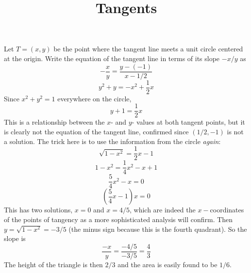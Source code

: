 \documentclass[11pt, oneside]{article}
\title{Tangents}
\date{}
\begin{document}
\maketitle
\large
Let $T=(x,y)$ be the point where the tangent line meets a unit circle centered at the origin.  Write the equation of the tangent line in terms of its slope $-x/y$ as
\[ -\frac{x}{y} =  \frac{y - (-1)}{x - 1/2} \]
\[ y^2 + y = -x^2 + \frac{1}{2} x \]
Since $x^2 + y^2 = 1$ everywhere on the circle,
\[ y + 1 = \frac{1}{2} x  \]
This is a relationship between the $x$- and $y$- values at both tangent points, but it is clearly not the equation of the tangent line, confirmed since $(1/2,-1)$ is not a solution.  The trick here is to use the information from the circle \emph{again}:
\[ \sqrt{1 - x^2} = \frac{1}{2} x - 1 \]
\[ 1 - x^2 = \frac{1}{4}x^2 - x + 1 \]
\[ \frac{5}{4}x^2 - x = 0 \]
\[ (\frac{5}{4}x - 1)x = 0 \]
This has two solutions, $x = 0$ and $x = 4/5$, which are indeed the $x-$coordinates of the points of tangency as a more sophisticated analysis will confirm.  Then $y = \sqrt{1 - x^2} = -3/5$ (the minus sign because this is the fourth quadrant).  So the slope is 
\[ \frac{-x}{y} = \frac{-4/5}{-3/5} = \frac{4}{3} \]
The height of the triangle is then $2/3$ and the area is easily found to be $1/6$.
\end{document}
